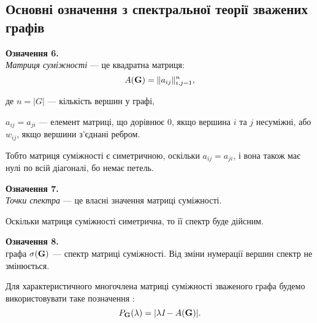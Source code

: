 \subsection{Основні означення з спектральної теорії зважених графів}

 \textbf{Означення 6.}\\
\emph{Матриця суміжності} --- це квадратна матриця:
\begin{equation}
    {A({\bf G})}=\|a_{ij}\|_{i,j=1}^{n},
\end{equation}

де $n=|{ G}|$ --- кількість вершин у графі,

 $a_{ij}=a_{ji}$ --- елемент матриці, що дорівнює 0, якщо вершина $i$ та $j$ несуміжні, або $w_{ij}$, якщо вершини з'єднані ребром. 

Тобто матриця суміжності є симетричною, оскільки $a_{ij}=a_{ji}$, і вона також має нулі по всій діагоналі, бо немає петель.

 \textbf{Означення 7.}\\
 \textit{Точки спектра} --- це власні значення матриці суміжності.
 
 Оскільки матриця суміжності симетрична, то її спектр буде дійсним.
 
 \textbf{Означення 8.}\\
{} графа $\sigma({\bf G})$ --- спектр матриці суміжності. Від зміни нумерації вершин спектр не змінюється.

Для характеристичного многочлена матриці суміжності зваженого графа будемо використовувати таке позначення : 
\begin{equation}\label{eq1}
    P_{\bf G}(\lambda)=|\lambda\textit{I}-A(\bf G)|.
\end{equation}

